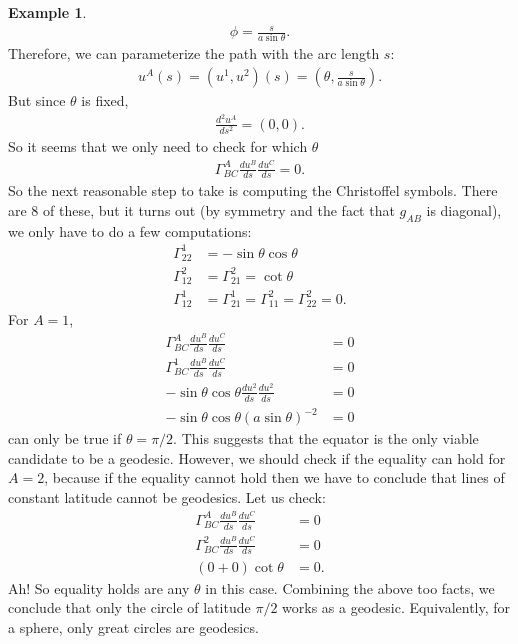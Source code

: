 \documentclass{book}
\theoremstyle{definition}
\newtheorem{exmp}{Example}[section]
\begin{document}
\begin{exmp}
	\begin{align*}
	\phi = \frac{s}{a\sin\theta}.
	\end{align*}
	Therefore, we can parameterize the path with the arc length $s$:
	\begin{align*}
	u^A(s) = (u^1,u^2)(s) = \left(\theta, \frac{s}{a\sin\theta}\right).
	\end{align*}
	But since $\theta$ is fixed,
	\begin{align*}
	\frac{d^2u^A}{ds^2} = (0,0).
	\end{align*}
	So it seems that we only need to check for which $\theta$
	\begin{align*}
	\Gamma^{A}_{BC}\frac{du^B}{ds}\frac{du^C}{ds} = 0.
	\end{align*}
	So the next reasonable step to take is computing the Christoffel symbols. There are 8 of these, but it turns out (by symmetry and the fact that $g_{AB}$ is diagonal), we only have to do a few computations:
	\begin{align*}
	\Gamma^1_{22} &= -\sin\theta\cos\theta\\
	\Gamma^2_{12} &= \Gamma^2_{21} = \cot\theta\\
	\Gamma^1_{12} &= \Gamma^1_{21} = \Gamma^2_{11} = \Gamma^2_{22} = 0.
	\end{align*}
	For $A = 1$, 
	\begin{align*}
	\Gamma^{A}_{BC}\frac{du^B}{ds}\frac{du^C}{ds} &= 0\\
	\Gamma^{1}_{BC}\frac{du^B}{ds}\frac{du^C}{ds} &= 0\\
	-\sin\theta\cos\theta\frac{du^2}{ds}\frac{du^2}{ds} &= 0\\
	-\sin\theta\cos\theta\left(a\sin\theta \right)^{-2} &= 0
	\end{align*}
	can only be true if $\theta = \pi/2$. This suggests that the equator is the only viable candidate to be a geodesic. However, we should check if the equality can hold for $A=2$, because if the equality cannot hold then we have to conclude that lines of constant latitude cannot be geodesics. Let us check:
	\begin{align*}
	\Gamma^{A}_{BC}\frac{du^B}{ds}\frac{du^C}{ds} &= 0\\
	\Gamma^{2}_{BC}\frac{du^B}{ds}\frac{du^C}{ds} &= 0\\
	(0+0)\cot\theta &= 0.
	\end{align*}
	Ah! So equality holds are any $\theta$ in this case. Combining the above too facts, we conclude that only the circle of latitude $\pi/2$ works as a geodesic. Equivalently, for a sphere, only great circles are geodesics.
\end{exmp}
\end{document}
